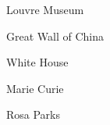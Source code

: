 \begin{figure*}[h]
\centering
\footnotesize
\begin{minipage}[t]{.025\textwidth}
     \vspace{0pt}
\end{minipage}%
\hspace{1ex}%
\begin{minipage}[t]{0.98\figwidth}
    \vspace{0pt}
    \begin{minipage}[t]{0.2\textwidth}
        \centering
        Louvre Museum
    \end{minipage}%
    \begin{minipage}[t]{0.2\textwidth}
        \centering
        Great Wall of China
    \end{minipage}%
    \begin{minipage}[t]{0.2\textwidth}
        \centering
        White House
    \end{minipage}%
    \begin{minipage}[t]{0.2\textwidth}
        \centering
        Marie Curie
    \end{minipage}%
    \begin{minipage}[t]{0.2\textwidth}
        \centering
        Rosa Parks
    \end{minipage}%
\end{minipage}



\end{figure*}
